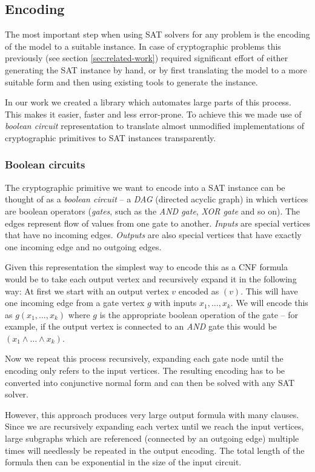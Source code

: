 \subsection{Encoding}
The most important step when using SAT solvers for any problem is the encoding of the model to a suitable instance.
In case of cryptographic problems this previously (see section \ref{sec:related-work}) required significant effort of either generating the SAT instance by hand, or by first translating the model to a more suitable form and then using existing tools to generate the instance.

In our work we created a library which automates large parts of this process.
This makes it easier, faster and less error-prone.
To achieve this we made use of \emph{boolean circuit} representation to translate almost unmodified implementations of cryptographic primitives to SAT instances transparently.

\subsubsection{Boolean circuits}
The cryptographic primitive we want to encode into a SAT instance can be thought of as a \emph{boolean circuit} -- a \emph{DAG} (directed acyclic graph) in which vertices are boolean operators (\emph{gates}, such as the \emph{AND gate}, \emph{XOR gate} and so on).
The edges represent flow of values from one gate to another.
\emph{Inputs} are special vertices that have no incoming edges.
\emph{Outputs} are also special vertices that have exactly one incoming edge and no outgoing edges.

Given this representation the simplest way to encode this as a CNF formula would be to take each output vertex and recursively expand it in the following way:
At first we start with an output vertex $v$ encoded as $(v)$.
This will have one incoming edge from a gate vertex $g$ with inputs $x_1, \dots, x_k$.
We will encode this as $g(x_1, \dots, x_k)$ where $g$ is the appropriate boolean operation of the gate -- for example, if the output vertex is connected to an \emph{AND} gate this would be $(x_1 \land \dots \land x_k)$.

Now we repeat this process recursively, expanding each gate node until the encoding only refers to the input vertices.
The resulting encoding has to be converted into conjunctive normal form and can then be solved with any SAT solver.

However, this approach produces very large output formula with many clauses.
Since we are recursively expanding each vertex until we reach the input vertices, large subgraphs which are referenced (connected by an outgoing edge) multiple times will needlessly be repeated in the output encoding.
The total length of the formula then can be exponential in the size of the input circuit.

